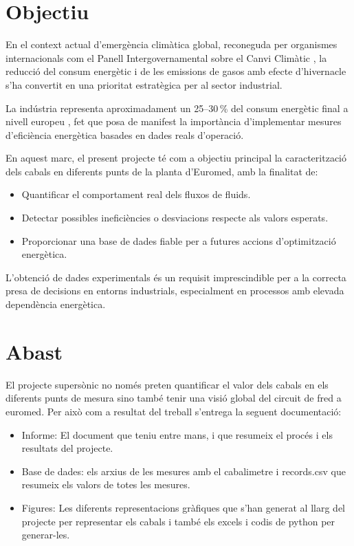 \documentclass[11pt]{article}
\begin{document}
\section{Objectiu}

En el context actual d'emergència climàtica global, reconeguda per organismes internacionals com el Panell Intergovernamental sobre el Canvi Climàtic \cite{IPCC2023}, la reducció del consum energètic i de les emissions de gasos amb efecte d'hivernacle s'ha convertit en una prioritat estratègica per al sector industrial.

La indústria representa aproximadament un 25--30\,\% del consum energètic final a nivell europeu \cite{EU2023}, fet que posa de manifest la importància d'implementar mesures d'eficiència energètica basades en dades reals d'operació.

En aquest marc, el present projecte té com a objectiu principal la caracterització dels cabals en diferents punts de la planta d'Euromed, amb la finalitat de:

\begin{itemize}
    \item Quantificar el comportament real dels fluxos de fluids.
    \item Detectar possibles ineficiències o desviacions respecte als valors esperats.
    \item Proporcionar una base de dades fiable per a futures accions d'optimització energètica.
\end{itemize}

L'obtenció de dades experimentals és un requisit imprescindible per a la correcta presa de decisions en entorns industrials, especialment en processos amb elevada dependència energètica.

\section{Abast}

El projecte supersònic no només preten quantificar el valor dels cabals en els diferents punts de mesura sino també tenir una visió global del circuit de fred a euromed. Per això com a resultat del treball s'entrega la seguent documentació:

\begin{itemize}
    \item Informe: El document que teniu entre mans, i que resumeix el procés i els resultats del projecte.
    \item Base de dades: els arxius de les mesures amb el cabalimetre i records.csv que resumeix els valors de totes les mesures.
    \item Figures: Les diferents representacions gràfiques que s'han generat al llarg del projecte per representar els cabals i també els excels i codis de python per generar-les.
\end{itemize}
\end{document}
